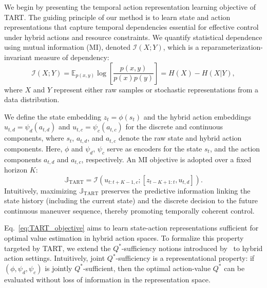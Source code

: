 We begin by presenting the temporal action representation learning objective of TART.
The guiding principle of our method is to learn state and action representations that capture temporal dependencies essential for effective control under hybrid actions and resource constraints.
We quantify statistical dependence using mutual information (MI), denoted $\mathcal{I}(X;Y)$, which is a reparameterization-invariant measure of dependency:
\begin{equation}
    \mathcal{I}(X;Y)=\mathbb{E}_{p(x,y)} \log [\frac{p(x,y)}{p(x)p(y)}] = H(X) - H(X|Y),
    \label{eq:MI}
\end{equation}
where $X$ and $Y$ represent either raw samples or stochastic representations from a data distribution.

We define the state embedding $z_t=\phi(s_t)$ and the hybrid action embeddings $u_{t,d}=\psi_d(a_{t,d})$ and $u_{t,c}=\psi_c(a_{t,c})$ for the discrete and continuous components, where $s_t$, $a_{t, d}$, and $a_{t,c}$ denote the raw state and hybrid action components.
Here, $\phi$ and $\psi_d$, $\psi_c$ serve as encoders for the state $s_t$, and the action components $a_{t,d}$ and $a_{t,c}$, respectively.
An MI objective is adopted over a fixed horizon $K$:
\begin{equation}
    \mathbb{J}_{\text{TART}} = \mathcal{I}(u_{t:t+K-1,c};[z_{t-K+1:t}, u_{t,d}]).
    \label{eq:TART_objective}
\end{equation}
Intuitively, maximizing $\mathbb{J}_{\text{TART}}$ preserves the predictive information linking the state history (including the current state) and the discrete decision to the future continuous maneuver sequence, thereby promoting temporally coherent control.

Eq.~\eqref{eq:TART_objective} aims to learn state-action representations sufficient for optimal value estimation in hybrid action spaces.
To formalize this property targeted by TART, we extend the $Q^*$-sufficiency notions introduced by~\cite{rakelly2021which} to hybrid action settings.
Intuitively, joint $Q^*$-sufficiency is a representational property: if $(\phi, \psi_d, \psi_c)$ is jointly $Q^*$-sufficient, then the optimal action-value $Q^*$ can be evaluated without loss of information in the representation space.

